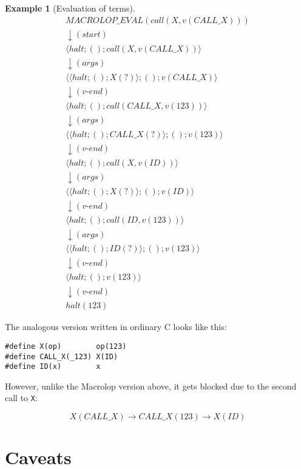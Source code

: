 \documentclass[12pt]{article}
\theoremstyle{break}
\newtheorem{example}{Example}
\begin{document}
\begin{example}[Evaluation of terms]
\small
\begin{gather*}
    MACROLOP\_EVAL(call(X, v(CALL\_X))) \\
    \downarrow (start) \\
    \langle halt; (); call(X, v(CALL\_X)) \rangle \\
    \downarrow (args) \\
    \langle \langle halt; (); X(?) \rangle; (); v(CALL\_X) \rangle \\
    \downarrow (v\mbox{-}end) \\
    \langle halt; (); call(CALL\_X, v(123)) \rangle \\
    \downarrow (args) \\
    \langle \langle halt; (); CALL\_X(?) \rangle; (); v(123) \rangle \\
    \downarrow (v\mbox{-}end) \\
    \langle halt; (); call(X, v(ID)) \rangle \\
    \downarrow (args) \\
    \langle \langle halt; (); X(?) \rangle; (); v(ID) \rangle \\
    \downarrow (v\mbox{-}end) \\
    \langle halt; (); call(ID, v(123)) \rangle \\
    \downarrow (args) \\
    \langle \langle halt; (); ID(?) \rangle; (); v(123) \rangle \\
    \downarrow (v\mbox{-}end) \\
    \langle halt; (); v(123) \rangle \\
    \downarrow (v\mbox{-}end) \\
    halt(123)
\end{gather*}
\normalsize
\end{example}

The analogous version written in ordinary C looks like this:

\begin{verbatim}
#define X(op)        op(123)
#define CALL_X(_123) X(ID)
#define ID(x)        x
\end{verbatim}

However, unlike the Macrolop version above, it gets blocked due to the
second call to \texttt{X}:

$$
X(CALL\_X) \to CALL\_X(123) \to X(ID)
$$

\section{Caveats}
\end{document}
